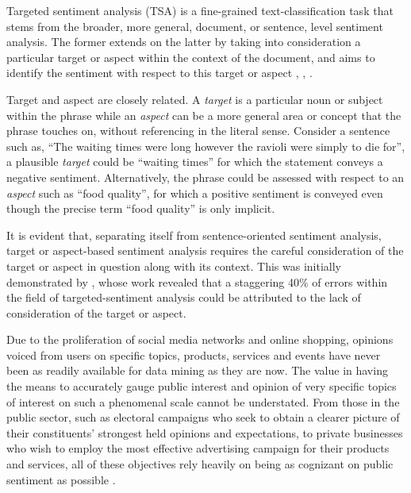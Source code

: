 \documentclass[../../fyp.tex]{subfiles}
\begin{document}
Targeted sentiment analysis (TSA) is a fine-grained text-classification task that stems from the broader, more general, document, or sentence, level sentiment analysis. The former extends on the latter by taking into consideration a particular target or aspect within the context of the document, and aims to identify the sentiment with respect to this target or aspect \cite{pang2008}, \cite{liu2012}, \cite{pontiki}.

Target and aspect are closely related. A \textit{target} is a particular noun or subject within the phrase while an \textit{aspect} can be a more general area or concept that the phrase touches on, without referencing in the literal sense. Consider a sentence such as, \enquote{The waiting times were long however the ravioli were simply to die for}, a plausible \textit{target} could be \enquote{waiting times} for which the statement conveys a negative sentiment. Alternatively, the phrase could be assessed with respect to an \textit{aspect} such as \enquote{food quality}, for which a positive sentiment is conveyed even though the precise term \enquote{food quality} is only implicit.

It is evident that, separating itself from sentence-oriented sentiment analysis, target or aspect-based sentiment analysis requires the careful consideration of the target or aspect in question along with its context. This was initially demonstrated by \cite{jiang2011}, whose work revealed that a staggering 40\% of errors within the field of targeted-sentiment analysis could be attributed to the lack of consideration of the target or aspect.

Due to the proliferation of social media networks and online shopping, opinions voiced from users on specific topics, products, services and events have never been as readily available for data mining as they are now. The value in having the means to accurately gauge public interest and opinion of very specific topics of interest on such a phenomenal scale cannot be understated. From those in the public sector, such as electoral campaigns who seek to obtain a clearer picture of their constituents' strongest held opinions and expectations, to private businesses who wish to employ the most effective advertising campaign for their products and services, all of these objectives rely heavily on being as cognizant on public sentiment as possible \cite{tang2016}.
\end{document}
